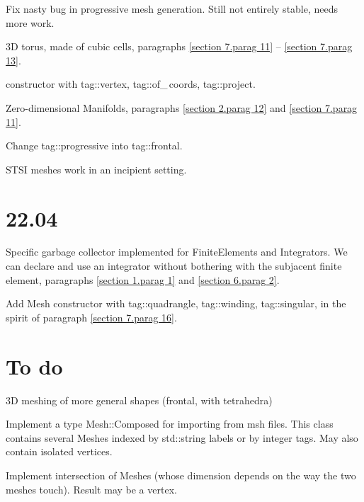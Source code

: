 \documentclass[a4paper]{scrreprt}
\def\numb{}
\newcommand\verm[1]{\textcolor{manif}{#1}}
\renewcommand\tt{\normalfont\ttfamily}
\begin{document}
\noindent Fix nasty bug in progressive mesh generation.
Still not entirely stable, needs more work.

\noindent 3D torus, made of cubic cells, paragraphs \ref{\numb section 7.\numb parag 11} --
\ref{\numb section 7.\numb parag 13}.

\noindent {\small\tt\verm{Cell}} constructor with {\small\tt\textcolor{tag}{tag}::vertex},
{\small\tt\textcolor{tag}{tag}::of\_\,coords}, {\small\tt\textcolor{tag}{tag}::project}.

\noindent Zero-dimensional {\small\tt\verm{Manifold}}s, paragraphs
\ref{\numb section 2.\numb parag 12} and \ref{\numb section 7.\numb parag 11}.

\noindent Change {\small\tt\textcolor{tag}{tag}::progressive} into
{\small\tt\textcolor{tag}{tag}::frontal}.

\noindent STSI meshes work in an incipient setting.


\section*{22.04}

\noindent Specific garbage collector implemented for
{\small\tt\verm{FiniteElement}}s and {\small\tt\verm{Integrator}}s.
We can declare and use an integrator without bothering with the subjacent finite element,
paragraphs \ref{\numb section 1.\numb parag 1} and \ref{\numb section 6.\numb parag 2}.

Add {\small\tt\verm{Mesh}} constructor with {\small\tt\textcolor{tag}{tag}::quadrangle},
{\small\tt\textcolor{tag}{tag}::winding}, {\small\tt\textcolor{tag}{tag}::singular},
in the spirit of paragraph \ref{\numb section 7.\numb parag 16}.


\section*{To do}

\noindent 3D meshing of more general shapes (frontal, with tetrahedra)

\noindent Implement a type {\small\tt\verm{Mesh}::Composed} for importing from 
{\small\tt msh} files.
This class contains several {\small\tt\verm{Mesh}}es indexed by {\small\tt std::string}
labels or by integer tags.
May also contain isolated vertices.

\noindent Implement intersection of {\small\tt\verm{Mesh}}es (whose dimension depends on the
way the two meshes touch).
Result may be a vertex.
\end{document}
